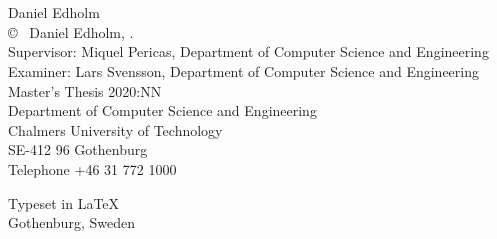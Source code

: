 \newpage
\thispagestyle{plain}
\vspace*{4.5cm}
\THETITLE\\
\TITLEDESCR\\
Daniel Edholm\\[0.5cm]

\copyright ~ Daniel Edholm, \the\year.\\[0.5cm]

Supervisor: Miquel Pericas, Department of Computer Science and Engineering\\
Examiner: Lars Svensson, Department of Computer Science and Engineering\\[0.5cm]

Master's Thesis 2020:NN\\
Department of Computer Science and Engineering\\
Chalmers University of Technology\\
SE-412 96 Gothenburg\\
Telephone +46 31 772 1000\\

\vfill

Typeset in \LaTeX \\
Gothenburg, Sweden \the\year
